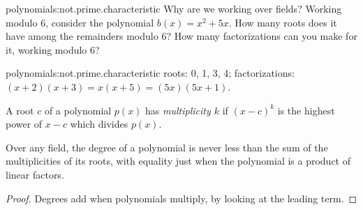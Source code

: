 \begin{problem}{polynomials:not.prime.characteristic}
Why are we working over fields?
Working modulo \(6\), consider the polynomial \(b(x)=x^2+5x\).
How many roots does it have among the remainders modulo \(6\)?
How many factorizations can you make for it, working modulo \(6\)?
\end{problem}
\begin{answer}{polynomials:not.prime.characteristic}
roots: 0, 1, 3, 4; factorizations: \((x+2)(x+3)=x(x+5)=(5x)(5x+1)\).
\end{answer}
A root \(c\) of a polynomial \(p(x)\) has \emph{multiplicity \(k\)} if \((x-c)^k\) is the highest power of \(x-c\) which divides \(p(x)\).
\begin{corollary}\label{corollary:degree.factors}
Over any field, the degree of a polynomial is never less than the sum of the multiplicities of its roots, with equality just when the polynomial is a product of linear factors.
\end{corollary}
\begin{proof}
Degrees add when polynomials multiply, by looking at the leading term.
\end{proof}

